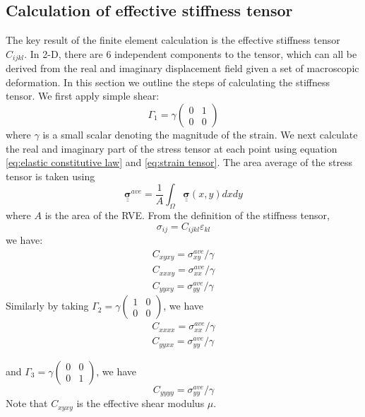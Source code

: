 \documentclass[12pt]{article}
\newcommand{\tensor}[1]{\underline{\underline{\boldsymbol{#1}}}}
\begin{document}
\subsection{Calculation of effective stiffness tensor}
The key result of the finite element calculation is the effective stiffness tensor $C_{ijkl}$. In 2-D, there are 6 independent components to the tensor, which can all be derived from the real and imaginary displacement field given a set of macroscopic deformation. In this section we outline the steps of calculating the stiffness tensor.
We first apply simple shear:
\begin{equation}
    \Gamma_1 = \gamma\begin{pmatrix}
        0&1\\
        0&0
    \end{pmatrix}
\end{equation}
where $\gamma$ is a small scalar denoting the magnitude of the strain. We next calculate the real and imaginary part of the stress tensor at each point using equation \ref{eq:elastic constitutive law} and \ref{eq:strain tensor}. The area average of the stress tensor is taken using
\begin{equation}
    \tensor{\sigma}^{ave} = \frac{1}{A}\int_{\Omega} \tensor{\sigma}(x,y)dxdy
\end{equation} where $A$ is the area of the RVE.
From the definition of the stiffness tensor,
\begin{equation}
    \sigma_{ij} = C_{ijkl}\varepsilon_{kl}
\end{equation}
we have:
\begin{align}
    C_{xyxy} = \sigma^{ave}_{xy}/\gamma\\
    C_{xxxy} = \sigma^{ave}_{xx}/\gamma\\
    C_{yyxy} = \sigma^{ave}_{yy}/\gamma
\end{align}
Similarly by taking $\Gamma_2 = \gamma\begin{pmatrix}
    1&0\\
    0&0
\end{pmatrix}$, we have
\begin{align}
    C_{xxxx} = \sigma^{ave}_{xx}/\gamma\\
    C_{yyxx} = \sigma^{ave}_{yy}/\gamma
\end{align}

and $\Gamma_3 = \gamma\begin{pmatrix}
    0&0\\
    0&1
\end{pmatrix}$, we have
\begin{equation}
    C_{yyyy} = \sigma^{ave}_{yy}/\gamma
\end{equation}
Note that $C_{xyxy}$ is the effective shear modulus $\mu$.
\end{document}
